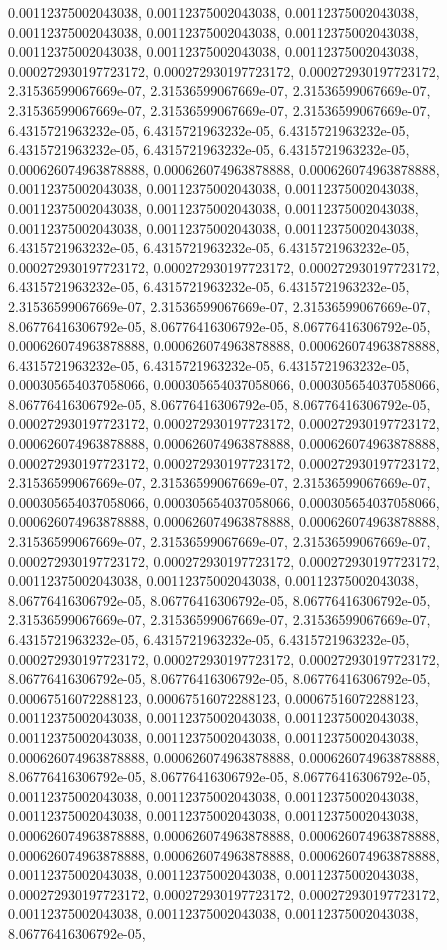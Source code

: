 \documentclass[
  ,man]{apa6}
\begin{document}
0.00112375002043038, 0.00112375002043038, 0.00112375002043038, 0.00112375002043038, 0.00112375002043038, 0.00112375002043038, 0.00112375002043038, 0.00112375002043038, 0.00112375002043038, 0.000272930197723172, 0.000272930197723172, 0.000272930197723172, 2.31536599067669e-07, 2.31536599067669e-07, 2.31536599067669e-07, 2.31536599067669e-07, 2.31536599067669e-07, 2.31536599067669e-07, 6.4315721963232e-05, 6.4315721963232e-05, 6.4315721963232e-05, 6.4315721963232e-05, 6.4315721963232e-05, 6.4315721963232e-05,
0.000626074963878888, 0.000626074963878888, 0.000626074963878888, 0.00112375002043038, 0.00112375002043038, 0.00112375002043038, 0.00112375002043038, 0.00112375002043038, 0.00112375002043038, 0.00112375002043038, 0.00112375002043038, 0.00112375002043038, 6.4315721963232e-05, 6.4315721963232e-05, 6.4315721963232e-05, 0.000272930197723172, 0.000272930197723172, 0.000272930197723172, 6.4315721963232e-05, 6.4315721963232e-05, 6.4315721963232e-05, 2.31536599067669e-07, 2.31536599067669e-07, 2.31536599067669e-07,
8.06776416306792e-05, 8.06776416306792e-05, 8.06776416306792e-05, 0.000626074963878888, 0.000626074963878888, 0.000626074963878888, 6.4315721963232e-05, 6.4315721963232e-05, 6.4315721963232e-05, 0.000305654037058066, 0.000305654037058066, 0.000305654037058066, 8.06776416306792e-05, 8.06776416306792e-05, 8.06776416306792e-05, 0.000272930197723172, 0.000272930197723172, 0.000272930197723172, 0.000626074963878888, 0.000626074963878888, 0.000626074963878888, 0.000272930197723172, 0.000272930197723172,
0.000272930197723172, 2.31536599067669e-07, 2.31536599067669e-07, 2.31536599067669e-07, 0.000305654037058066, 0.000305654037058066, 0.000305654037058066, 0.000626074963878888, 0.000626074963878888, 0.000626074963878888, 2.31536599067669e-07, 2.31536599067669e-07, 2.31536599067669e-07, 0.000272930197723172, 0.000272930197723172, 0.000272930197723172, 0.00112375002043038, 0.00112375002043038, 0.00112375002043038, 8.06776416306792e-05, 8.06776416306792e-05, 8.06776416306792e-05, 2.31536599067669e-07,
2.31536599067669e-07, 2.31536599067669e-07, 6.4315721963232e-05, 6.4315721963232e-05, 6.4315721963232e-05, 0.000272930197723172, 0.000272930197723172, 0.000272930197723172, 8.06776416306792e-05, 8.06776416306792e-05, 8.06776416306792e-05, 0.00067516072288123, 0.00067516072288123, 0.00067516072288123, 0.00112375002043038, 0.00112375002043038, 0.00112375002043038, 0.00112375002043038, 0.00112375002043038, 0.00112375002043038, 0.000626074963878888, 0.000626074963878888, 0.000626074963878888, 8.06776416306792e-05,
8.06776416306792e-05, 8.06776416306792e-05, 0.00112375002043038, 0.00112375002043038, 0.00112375002043038, 0.00112375002043038, 0.00112375002043038, 0.00112375002043038, 0.000626074963878888, 0.000626074963878888, 0.000626074963878888, 0.000626074963878888, 0.000626074963878888, 0.000626074963878888, 0.00112375002043038, 0.00112375002043038, 0.00112375002043038, 0.000272930197723172, 0.000272930197723172, 0.000272930197723172, 0.00112375002043038, 0.00112375002043038, 0.00112375002043038, 8.06776416306792e-05,
\end{document}
